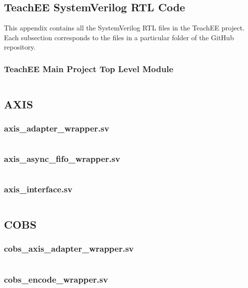 \documentclass[letterpaper,11pt]{article}
\begin{document}
\begin{appendices}
    \section{TeachEE SystemVerilog RTL Code} \label{appendix:rtl-code}
    This appendix contains all the SystemVerilog RTL files in the TeachEE
    project. Each subsection corresponds to the files in a particular folder of
    the GitHub repository.

    \subsubsection{TeachEE Main Project Top Level Module}
    \inputminted[linenos,breaklines]{systemverilog}{../../rtl/teachee/teachee.sv}

    \subsection{AXIS} \label{appendix:axis}
    \subsubsection{axis\_adapter\_wrapper.sv}
    \inputminted[linenos,breaklines]{systemverilog}{../../rtl/axis/axis_adapter_wrapper.sv}
    \subsubsection{axis\_async\_fifo\_wrapper.sv}
    \inputminted[linenos,breaklines]{systemverilog}{../../rtl/axis/axis_async_fifo_wrapper.sv}
    \subsubsection{axis\_interface.sv} \label{appendix:axis-interface}
    \inputminted[linenos,breaklines]{systemverilog}{../../rtl/axis/axis_interface.sv}

    \subsection{COBS}
    \subsubsection{cobs\_axis\_adapter\_wrapper.sv}
    \inputminted[linenos,breaklines]{systemverilog}{../../rtl/cobs/cobs_axis_adapter_wrapper.sv}
    \subsubsection{cobs\_encode\_wrapper.sv}
    \inputminted[linenos,breaklines]{systemverilog}{../../rtl/cobs/cobs_encode_wrapper.sv}


\end{appendices}
\end{document}
